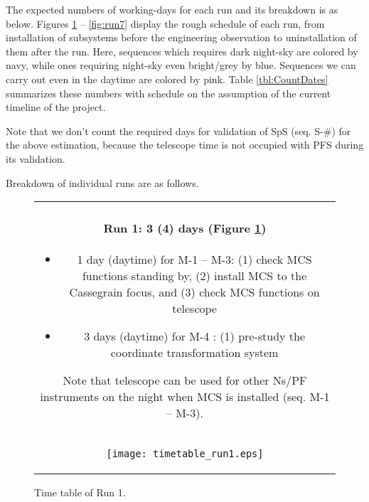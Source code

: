 The expected numbers of working-days for each run and its breakdown is as below.
Figures \ref{fig:run1} -- \ref{fig:run7}  display the rough schedule of each run, from installation of subsystems before the engineering observation to uninstallation of them after the run.
Here, sequences which requires dark night-sky are colored by navy, while ones requiring night-sky even bright/grey by blue.
Sequences we can carry out even in the daytime are colored by pink.
Table \ref{tbl:CountDates} summarizes these numbers with schedule on the assumption of the current timeline of the project.

Note that we don't count the required days for validation of SpS (seq. S-\#) for the above estimation, because the telescope time is not occupied with PFS during its validation.

Breakdown of individual runs are as follows.

\begin{figure}[!ht]
\begin{center}
\begin{tabular}{c}
\begin{minipage}{0.95\hsize}
\paragraph{Run 1: 3 (4) days (Figure \ref{fig:run1})}
	\begin{itemize}
 	\item 1 day (daytime) for M-1 --  M-3: 
	(1) check MCS functions standing by,
	(2) install MCS to the Cassegrain focus, and
	(3) check MCS functions on telescope
 	\item 3 days (daytime) for M-4 : 
	(1) pre-study the coordinate transformation system
	\end{itemize}
Note that telescope can be used for other Ns/PF instruments on the night when MCS is installed (seq. M-1 -- M-3).
\end{minipage} \\
\begin{minipage}{0.8\hsize}
	\begin{center}
	\vspace*{5mm}
	\texttt{[image: timetable\_run1.eps]}
	\end{center}
	\vspace*{-5mm}
	\caption{Time table of Run 1.}
	\label{fig:run1}
\end{minipage}
\end{tabular}
\end{center}
\end{figure}

